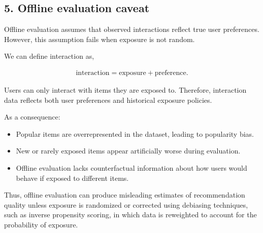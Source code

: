 \documentclass[11pt]{article}
\begin{document}
\begin{appendices}
\subsection*{5. Offline evaluation caveat}

Offline evaluation assumes that observed interactions reflect true user preferences. However, this assumption fails when exposure is not random.

We can define interaction as,

\begin{align*}
\text{interaction} = \text{exposure} + \text{preference}.
\end{align*}

Users can only interact with items they are exposed to. Therefore, interaction data reflects both user preferences and historical exposure policies.

As a consequence:

\begin{itemize}

\item Popular items are overrepresented in the dataset, leading to popularity bias.

\item New or rarely exposed items appear artificially worse during evaluation.

\item Offline evaluation lacks counterfactual information about how users would behave if exposed to different items.

\end{itemize}

Thus, offline evaluation can produce misleading estimates of recommendation quality unless exposure is randomized or corrected using debiasing techniques, such as inverse propensity scoring, in which data is reweighted to account for the probability of exposure.

\end{appendices}
\end{document}
